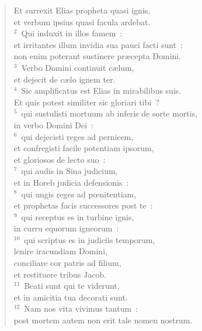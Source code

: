 \begin{flushleft}\begin{verse}\vspace{-19pt}\hspace{6pt}Et surrexit Elias propheta quasi ignis,\\\hspace{6pt} et verbum ipsius quasi facula ardebat.\\
${}^{2}$~Qui induxit in illos famem~:\\ et irritantes illum invidia sua pauci facti sunt~:\\ non enim poterant sustinere pr\ae cepta Domini.\\
${}^{3}$~Verbo Domini continuit c\ae lum,\\ et dejecit de c\ae lo ignem ter.\\
${}^{4}$~Sic amplificatus est Elias in mirabilibus suis.\\ Et quis potest similiter sic gloriari tibi~?\\
${}^{5}$~qui sustulisti mortuum ab inferis de sorte mortis,\\ in verbo Domini Dei~:\\
${}^{6}$~qui dejecisti reges ad pernicem,\\ et confregisti facile potentiam ipsorum,\\ et gloriosos de lecto suo~:\\
${}^{7}$~qui audis in Sina judicium,\\ et in Horeb judicia defensionis~:\\
${}^{8}$~qui ungis reges ad pœnitentiam,\\ et prophetas facis successores post te~:\\
${}^{9}$~qui receptus es in turbine ignis,\\ in curru equorum igneorum~:\\
${}^{10}$~qui scriptus es in judiciis temporum,\\ lenire iracundiam Domini,\\ conciliare cor patris ad filium,\\ et restituere tribus Jacob.\\
${}^{11}$~Beati sunt qui te viderunt,\\ et in amicitia tua decorati sunt.\\
${}^{12}$~Nam nos vita vivimus tantum~:\\ post mortem autem non erit tale nomen nostrum.\end{verse}\end{flushleft}


